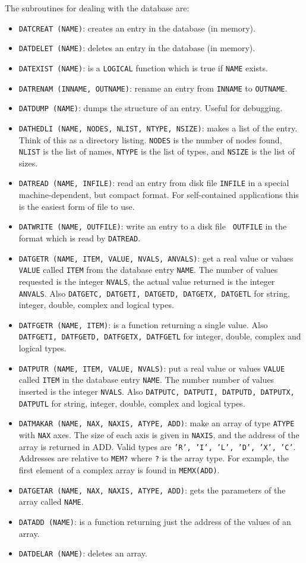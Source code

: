 The subroutines for dealing with the database are:

\begin{itemize}
\item {\tt DATCREAT (NAME)}: creates an entry in the database (in memory).
\item {\tt DATDELET (NAME)}: deletes an entry in the database (in memory).
\item {\tt DATEXIST (NAME)}: is a {\tt LOGICAL} function which is true if
{\tt NAME} exists.
\item {\tt DATRENAM (INNAME, OUTNAME)}: rename an entry from {\tt INNAME} to
{\tt OUTNAME}.
\item {\tt DATDUMP (NAME)}: dumps the structure of an entry. Useful for
debugging.
\item {\tt DATHEDLI (NAME, NODES, NLIST, NTYPE, NSIZE)}: makes a list of
the entry. Think of this as a directory listing. {\tt NODES} is the
number of nodes found, {\tt NLIST} is the list of names, {\tt NTYPE} is
the list of types, and {\tt NSIZE} is the list of sizes.
\item {\tt DATREAD (NAME, INFILE)}: read an entry from disk file {\tt INFILE}
in a special machine-dependent, but compact format. For 
self-contained applications this is the easiest form of file to use. 
\item {\tt DATWRITE (NAME, OUTFILE)}: write an entry to a disk file {\tt 
OUTFILE} in the format which is read by {\tt DATREAD}.
\item {\tt DATGETR (NAME, ITEM, VALUE, NVALS, ANVALS)}: get a real value or
values {\tt VALUE} called {\tt ITEM} from the database entry {\tt NAME}. The 
number
of values requested is the integer {\tt NVALS}, the actual value returned
is the integer {\tt ANVALS}. Also {\tt DATGETC, DATGETI, DATGETD, DATGETX,
DATGETL} for string, integer, double, complex and logical types.
\item {\tt DATFGETR (NAME, ITEM)}: is a function returning a single value.
Also {\tt DATFGETI, DATFGETD, DATFGETX,
DATFGETL} for integer, double, complex and logical types.
\item {\tt DATPUTR (NAME, ITEM, VALUE, NVALS)}: put a real value or values
{\tt VALUE} called {\tt ITEM} in the database entry {\tt NAME}. The number
number of values inserted is the integer {\tt NVALS}.
Also {\tt DATPUTC, DATPUTI, DATPUTD, DATPUTX,
DATPUTL} for string, integer, double, complex and logical types.
\item {\tt DATMAKAR (NAME, NAX, NAXIS, ATYPE, ADD)}: make an array of type
{\tt ATYPE} with {\tt NAX} axes. The size of each axis is given in
{\tt NAXIS}, and the address of the array is returned in ADD. Valid
types are {\tt 'R', 'I', 'L', 'D', 'X', 'C'}. Addresses are relative
to {\tt MEM?} where {\tt ?} is the array type.  For example, the first
element of a complex array is found in {\tt MEMX(ADD)}.
\item {\tt DATGETAR (NAME, NAX, NAXIS, ATYPE, ADD)}: gets the parameters of the
array called {\tt NAME}.
\item {\tt DATADD (NAME)}: is a function returning just the address of the 
values of an array.
\item {\tt DATDELAR (NAME)}: deletes an array.
\end{itemize}
